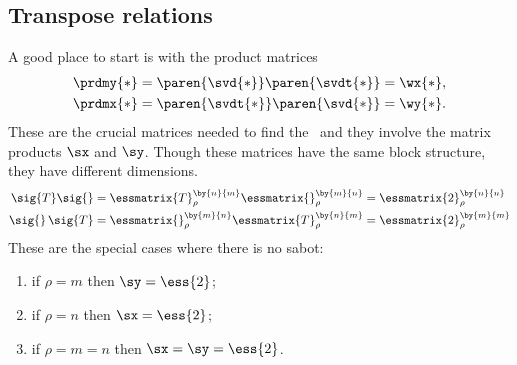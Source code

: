 \subsection{Transpose relations}
A good place to start is with the product matrices
\begin{equation}
  \begin{split}
    \prdmy{*} = \paren{ \svd{*} } \paren{ \svdt{*} } = \wx{*},\\
    \prdmx{*} = \paren{ \svdt{*} }\paren{ \svd{*} }  = \wy{*}.\\
  \end{split}
\end{equation}
These are the crucial matrices needed to find the \svdl \ and they involve the matrix products $\sx$ and $\sy$. Though these matrices have the same block structure, they have different dimensions.
\begin{equation}
  \begin{split}
  \sig{T}\sig{} &= 
  \essmatrix{T}^{\by{n}{m}}_{\rho} 
  \essmatrix{}^{\by{m}{n}}_{\rho} = 
  \essmatrix{2}^{\by{n}{n}}_{\rho} \\
  \sig{}\,\sig{T} &= 
  \essmatrix{}^{\by{m}{n}}_{\rho} 
  \essmatrix{T}^{\by{n}{m}}_{\rho} = 
  \essmatrix{2}^{\by{m}{m}}_{\rho}
  \end{split}
\end{equation}
These are the special cases where there is no sabot:
\begin{enumerate}
\item if $\rho=m$ then $\sy = \ess{2}$;
\item if $\rho=n$ then $\sx = \ess{2}$;
\item if $\rho=m=n$ then $\sx = \sy = \ess{2}$.
\end{enumerate}

